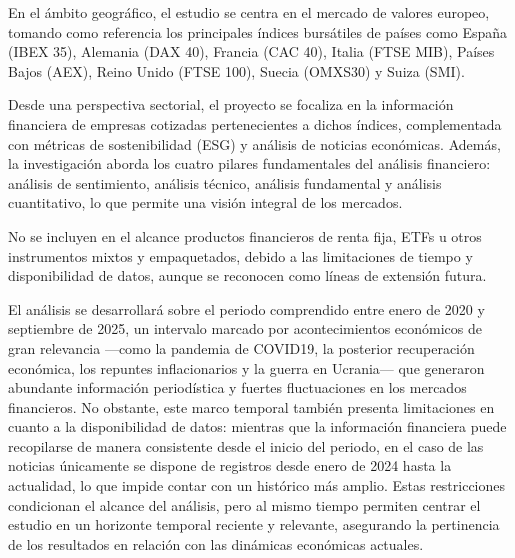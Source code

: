 \documentclass[letterpaper,10pt,spanish]{sphinxmanual}
\begin{document}
\sphinxAtStartPar
En el ámbito geográfico, el estudio se centra en el mercado de valores europeo, tomando como referencia los principales índices bursátiles de países como España (IBEX 35), Alemania (DAX 40), Francia (CAC 40), Italia (FTSE MIB), Países Bajos (AEX), Reino Unido (FTSE 100), Suecia (OMXS30) y Suiza (SMI).

\sphinxAtStartPar
Desde una perspectiva sectorial, el proyecto se focaliza en la información financiera de empresas cotizadas pertenecientes a dichos índices, complementada con métricas de sostenibilidad (ESG) y análisis de noticias económicas. Además, la investigación aborda los cuatro pilares fundamentales del análisis financiero: análisis de sentimiento, análisis técnico, análisis fundamental y análisis cuantitativo, lo que permite una visión integral de los mercados.

\sphinxAtStartPar
No se incluyen en el alcance productos financieros de renta fija, ETFs u otros instrumentos mixtos y empaquetados, debido a las limitaciones de tiempo y disponibilidad de datos, aunque se reconocen como líneas de extensión futura.

\sphinxAtStartPar
{}

\sphinxAtStartPar
El análisis se desarrollará sobre el periodo comprendido entre enero de 2020 y septiembre de 2025, un intervalo marcado por acontecimientos económicos de gran relevancia —como la pandemia de COVID\sphinxhyphen{}19, la posterior recuperación económica, los repuntes inflacionarios y la guerra en Ucrania— que generaron abundante información periodística y fuertes fluctuaciones en los mercados financieros. No obstante, este marco temporal también presenta limitaciones en cuanto a la disponibilidad de datos: mientras que la información financiera puede recopilarse de manera consistente desde el inicio del periodo, en el caso de las noticias únicamente se dispone de registros desde enero de 2024 hasta la actualidad, lo que impide contar con un histórico más amplio. Estas restricciones condicionan el alcance del análisis, pero al mismo tiempo permiten centrar el estudio en un horizonte temporal reciente y relevante, asegurando la pertinencia de los resultados en relación con las dinámicas económicas actuales.

\sphinxAtStartPar
{}
\end{document}

